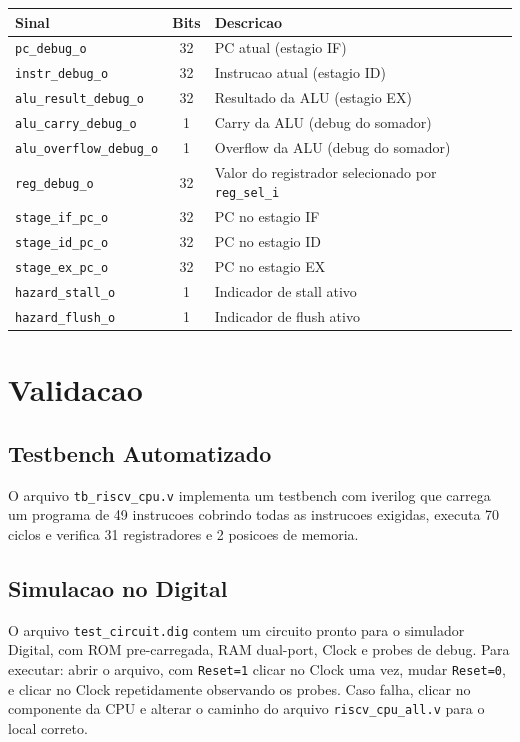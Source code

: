 \documentclass[12pt,a4paper]{article}
\begin{document}
\begin{tabularx}{\textwidth}{|l|c|X|}
\hline
\textbf{Sinal} & \textbf{Bits} & \textbf{Descricao} \\
\hline
\texttt{pc\_debug\_o} & 32 & PC atual (estagio IF) \\
\texttt{instr\_debug\_o} & 32 & Instrucao atual (estagio ID) \\
\texttt{alu\_result\_debug\_o} & 32 & Resultado da ALU (estagio EX) \\
\texttt{alu\_carry\_debug\_o} & 1 & Carry da ALU (debug do somador) \\
\texttt{alu\_overflow\_debug\_o} & 1 & Overflow da ALU (debug do somador) \\
\texttt{reg\_debug\_o} & 32 & Valor do registrador selecionado por \texttt{reg\_sel\_i} \\
\texttt{stage\_if\_pc\_o} & 32 & PC no estagio IF \\
\texttt{stage\_id\_pc\_o} & 32 & PC no estagio ID \\
\texttt{stage\_ex\_pc\_o} & 32 & PC no estagio EX \\
\texttt{hazard\_stall\_o} & 1 & Indicador de stall ativo \\
\texttt{hazard\_flush\_o} & 1 & Indicador de flush ativo \\
\hline
\end{tabularx}

\section{Validacao}

\subsection{Testbench Automatizado}
O arquivo \texttt{tb\_riscv\_cpu.v} implementa um testbench com iverilog que
carrega um programa de 49 instrucoes cobrindo todas as instrucoes exigidas,
executa 70 ciclos e verifica 31 registradores e 2 posicoes de memoria.

\subsection{Simulacao no Digital}
O arquivo \texttt{test\_circuit.dig} contem um circuito pronto para o simulador
Digital, com ROM pre-carregada, RAM dual-port, Clock e probes de debug.
Para executar: abrir o arquivo, com \texttt{Reset=1} clicar no Clock uma vez,
mudar \texttt{Reset=0}, e clicar no Clock repetidamente observando os probes. Caso falha,
clicar no componente da CPU e alterar o caminho do arquivo \texttt{riscv\_cpu\_all.v} para o local correto.
\end{document}
